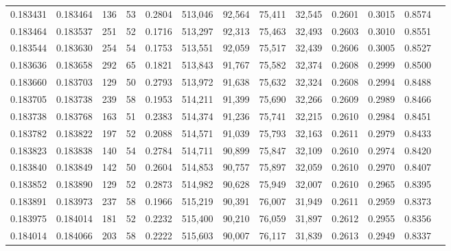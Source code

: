 \begin{tabular}{rrrrrrrrrrrrr}
0.183431 & 0.183464 &   136 &  53 &                                     0.2804 & 513,046 &  92,564 &  75,411 &  32,545 & 0.2601 & 0.3015 & 0.8574 \\
0.183464 & 0.183537 &   251 &  52 &                                     0.1716 & 513,297 &  92,313 &  75,463 &  32,493 & 0.2603 & 0.3010 & 0.8551 \\
0.183544 & 0.183630 &   254 &  54 &                                     0.1753 & 513,551 &  92,059 &  75,517 &  32,439 & 0.2606 & 0.3005 & 0.8527 \\
0.183636 & 0.183658 &   292 &  65 &                                     0.1821 & 513,843 &  91,767 &  75,582 &  32,374 & 0.2608 & 0.2999 & 0.8500 \\
0.183660 & 0.183703 &   129 &  50 &                                     0.2793 & 513,972 &  91,638 &  75,632 &  32,324 & 0.2608 & 0.2994 & 0.8488 \\
0.183705 & 0.183738 &   239 &  58 &                                     0.1953 & 514,211 &  91,399 &  75,690 &  32,266 & 0.2609 & 0.2989 & 0.8466 \\
0.183738 & 0.183768 &   163 &  51 &                                     0.2383 & 514,374 &  91,236 &  75,741 &  32,215 & 0.2610 & 0.2984 & 0.8451 \\
0.183782 & 0.183822 &   197 &  52 &                                     0.2088 & 514,571 &  91,039 &  75,793 &  32,163 & 0.2611 & 0.2979 & 0.8433 \\
0.183823 & 0.183838 &   140 &  54 &                                     0.2784 & 514,711 &  90,899 &  75,847 &  32,109 & 0.2610 & 0.2974 & 0.8420 \\
0.183840 & 0.183849 &   142 &  50 &                                     0.2604 & 514,853 &  90,757 &  75,897 &  32,059 & 0.2610 & 0.2970 & 0.8407 \\
0.183852 & 0.183890 &   129 &  52 &                                     0.2873 & 514,982 &  90,628 &  75,949 &  32,007 & 0.2610 & 0.2965 & 0.8395 \\
0.183891 & 0.183973 &   237 &  58 &                                     0.1966 & 515,219 &  90,391 &  76,007 &  31,949 & 0.2611 & 0.2959 & 0.8373 \\
0.183975 & 0.184014 &   181 &  52 &                                     0.2232 & 515,400 &  90,210 &  76,059 &  31,897 & 0.2612 & 0.2955 & 0.8356 \\
0.184014 & 0.184066 &   203 &  58 &                                     0.2222 & 515,603 &  90,007 &  76,117 &  31,839 & 0.2613 & 0.2949 & 0.8337 \\

\end{tabular}
